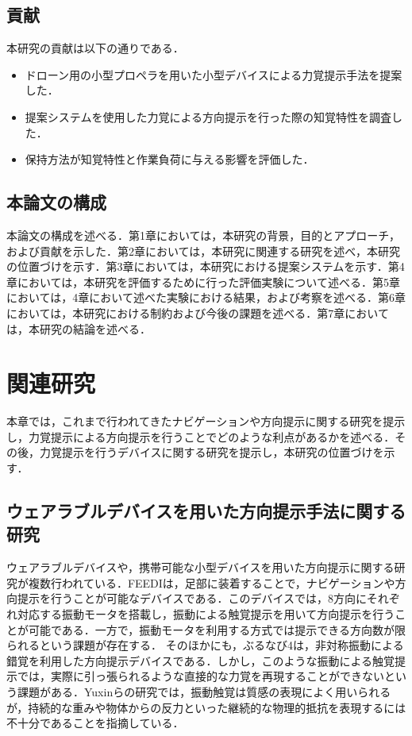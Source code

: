 \documentclass[a4paper,11pt]{jreport}
\begin{document}
\section{貢献}
本研究の貢献は以下の通りである．
\begin{itemize}
    \item ドローン用の小型プロペラを用いた小型デバイスによる力覚提示手法を提案した．
    \item 提案システムを使用した力覚による方向提示を行った際の知覚特性を調査した．
    \item 保持方法が知覚特性と作業負荷に与える影響を評価した．
\end{itemize}

\section{本論文の構成}
本論文の構成を述べる．第1章においては，本研究の背景，目的とアプローチ，および貢献を示した．第2章においては，本研究に関連する研究を述べ，本研究の位置づけを示す．第3章においては，本研究における提案システムを示す．第4章においては，本研究を評価するために行った評価実験について述べる．第5章においては，4章において述べた実験における結果，および考察を述べる．第6章においては，本研究における制約および今後の課題を述べる．第7章においては，本研究の結論を述べる．

\chapter{関連研究}
本章では，これまで行われてきたナビゲーションや方向提示に関する研究を提示し，力覚提示による方向提示を行うことでどのような利点があるかを述べる．その後，力覚提示を行うデバイスに関する研究を提示し，本研究の位置づけを示す．

\section{ウェアラブルデバイスを用いた方向提示手法に関する研究}
ウェアラブルデバイスや，携帯可能な小型デバイスを用いた方向提示に関する研究が複数行われている．FEEDI\cite{stock2020feedi}は，足部に装着することで，ナビゲーションや方向提示を行うことが可能なデバイスである．このデバイスでは，8方向にそれぞれ対応する振動モータを搭載し，振動による触覚提示を用いて方向提示を行うことが可能である．一方で，振動モータを利用する方式では提示できる方向数が限られるという課題が存在する．
そのほかにも，ぶるなび4\cite{ntt_burunavi4}は，非対称振動による錯覚を利用した方向提示デバイスである．しかし，このような振動による触覚提示では，実際に引っ張られるような直接的な力覚を再現することができないという課題がある．Yuxinらの研究\cite{ma2024airpush}では，振動触覚は質感の表現によく用いられるが，持続的な重みや物体からの反力といった継続的な物理的抵抗を表現するには不十分であることを指摘している．
\end{document}
